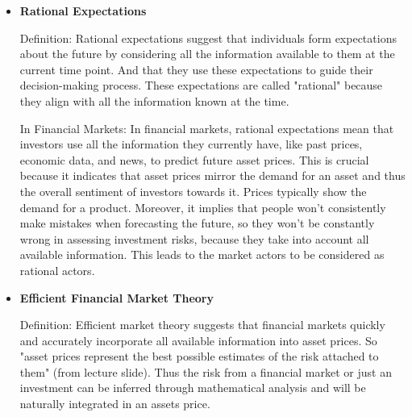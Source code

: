 \documentclass{article}
\begin{document}
\begin{itemize}
    \item \textbf{Rational Expectations}

Definition: Rational expectations suggest that individuals form expectations about the future by considering all the information available to them at the current time point. And that they use these expectations to guide their decision-making process. These expectations are called "rational" because they align with all the information known at the time.

In Financial Markets: In financial markets, rational expectations mean that investors use all the information they currently have, like past prices, economic data, and news, to predict future asset prices. This is crucial because it indicates that asset prices mirror the demand for an asset and thus the overall sentiment of investors towards it. Prices typically show the demand for a product. Moreover, it implies that people won't consistently make mistakes when forecasting the future, so they won't be constantly wrong in assessing investment risks, because they take into account all available information. This leads to the market actors to be considered as rational actors.


\item \textbf{Efficient Financial Market Theory}

Definition: Efficient market theory suggests that financial markets quickly and accurately incorporate all available information into asset prices. So "asset prices represent the best possible estimates of the risk attached to them" (from lecture slide). Thus the risk from a financial market or just an investment can be inferred through mathematical analysis and will be naturally integrated in an assets price.
\end{itemize}
\end{document}
